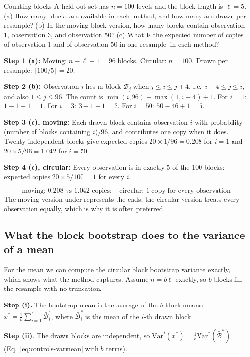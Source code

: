 \begin{sample}{Counting blocks}
A held-out set has $n=100$ levels and the block length is $\ell=5$. (a) How many blocks are available in each method, and how many are drawn per resample? (b) In the moving block version, how many blocks contain observation 1, observation 3, and observation 50? (c) What is the expected number of copies of observation 1 and of observation 50 in one resample, in each method?

\textbf{Step 1 (a):} Moving: $n-\ell+1=96$ blocks. Circular: $n=100$. Drawn per resample: $\lceil100/5\rceil=20$.

\textbf{Step 2 (b):} Observation $i$ lies in block $\mathcal B_j$ when $j\le i\le j+4$, i.e.\ $i-4\le j\le i$, and also $1\le j\le96$. The count is $\min(i,96)-\max(1,i-4)+1$. For $i=1$: $1-1+1=1$. For $i=3$: $3-1+1=3$. For $i=50$: $50-46+1=5$.

\textbf{Step 3 (c), moving:} Each drawn block contains observation $i$ with probability (number of blocks containing $i$)/96, and contributes one copy when it does. Twenty independent blocks give expected copies $20\times1/96=0.208$ for $i=1$ and $20\times5/96=1.042$ for $i=50$.

\textbf{Step 4 (c), circular:} Every observation is in exactly 5 of the 100 blocks: expected copies $20\times5/100=1$ for every $i$.

\[
\boxed{\text{moving: }0.208\text{ vs }1.042\text{ copies};\quad\text{circular: }1\text{ copy for every observation}}
\]
The moving version under-represents the ends; the circular version treats every observation equally, which is why it is often preferred.
\end{sample}

\subsection{What the block bootstrap does to the variance of a mean}

For the mean we can compute the circular block bootstrap variance exactly, which shows what the method captures. Assume $n=b\ell$ exactly, so $b$ blocks fill the resample with no truncation.

\textbf{Step (i).} The bootstrap mean is the average of the $b$ block means: $\bar x^*=\frac1b\sum_{i=1}^b\bar{\mathcal B}^*_i$, where $\bar{\mathcal B}^*_i$ is the mean of the $i$-th drawn block.

\textbf{Step (ii).} The drawn blocks are independent, so $\mathrm{Var}^*(\bar x^*)=\frac1b\mathrm{Var}^*(\bar{\mathcal B}^*)$ (Eq.~\eqref{eq:controls-varmean} with $b$ terms).

